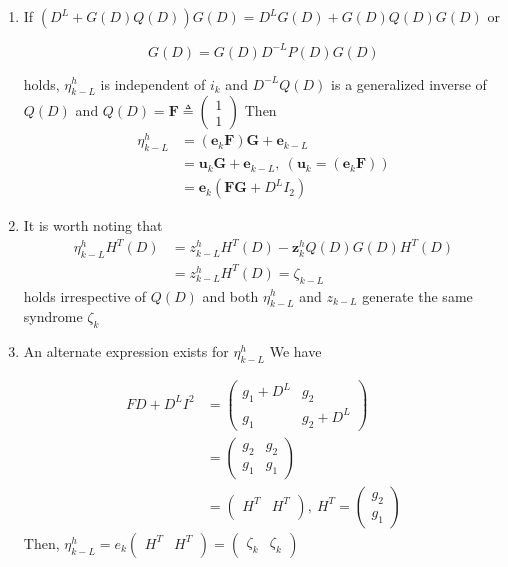 \documentclass[fontsize=12pt]{article}
\theoremstyle{definition}
\begin{document}
\begin{enumerate}
\item If $\left(D^L+G(D) Q(D)\right) G(D) = D^LG(D)+G(D) Q(D)G(D) $ or 

\begin{equation}
G(D)=G(D)D^{-L}P(D)G(D) 
\end{equation}

holds, $\eta_{k-L}^h$ is independent of $i_k$ and $D^{-L}Q(D)$ is a generalized inverse of $Q(D)$ and $Q(D)=\mathbf{F}\triangleq \left(\begin{array}{c}
{1} \\
{1}
\end{array}\right)$
Then 
\begin{equation}
\begin{aligned}
\eta_{k-L}^h &= (\mathbf{e}_{k} \mathbf{F})\mathbf{G}+\mathbf{e}_{k-L}\\
&=\mathbf{u}_k\mathbf{G}+\mathbf{e}_{k-L},~(\mathbf{u}_k=(\mathbf{e}_{k} \mathbf{F} ))\\
&=\mathbf{e}_k(\mathbf{F}\mathbf{G}+ D^LI_2)
\end{aligned}
\end{equation}

\item It is worth noting that 
\begin{equation}
\begin{aligned}
\eta_{k-L}^hH^T(D)&= z_{k-L}^hH^T(D) -\mathbf{z}_{k}^hQ(D)G(D)H^T(D) \\
&=z_{k-L}^hH^T(D)=\zeta_{k-L}
\end{aligned}
\end{equation}
 holds irrespective of $Q(D)$ and both $ \eta_{k-L}^h$ and $z_{k-L}$ generate the same syndrome $\zeta_k$

\item An alternate expression exists for $\eta_{k-L}^h$ We have 

\begin{equation}
\begin{aligned}
FD+D^LI^2&=\left(\begin{array}{cc}
g_1 + D^L & g_2\\
g_1 & g_2 + D^L
\end{array}\right)\\
&=\left(\begin{array}{cc}
g_2 & g_2\\
g_1 & g_1
\end{array}\right)\\
&=\left(\begin{array}{cc}
H^T & H^T\\
\end{array}\right),~H^T = \left(\begin{array}{c}
g_2 \\
g_1 
\end{array}\right)
\end{aligned}
\end{equation}
Then, $\eta_{k-L}^h=e_k\left(\begin{array}{cc}
H^T & H^T\\
\end{array}\right) = (\begin{array}{cc}
\zeta_k & \zeta_k
\end{array})$


\end{enumerate}
\end{document}
